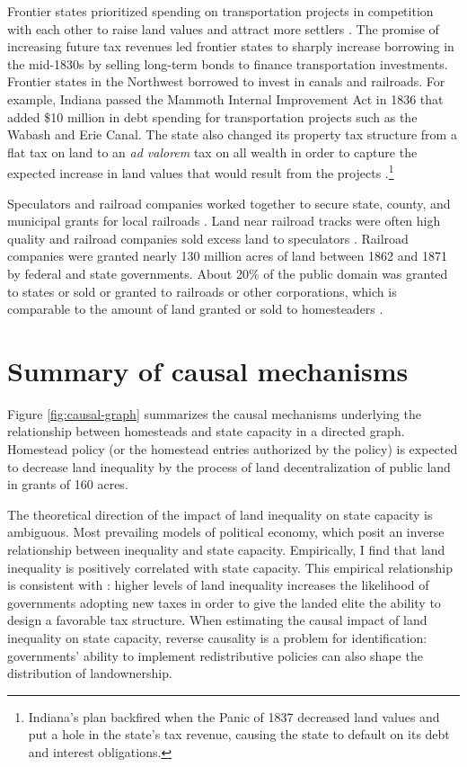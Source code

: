 Frontier states prioritized spending on transportation projects in competition with each other to raise land values and attract more settlers \citep{sylla1998anatomy}. The promise of increasing future tax revenues led frontier states to sharply increase borrowing in the mid-1830s by selling long-term bonds to finance transportation investments. Frontier states in the Northwest borrowed to invest in canals and railroads. For example, Indiana passed the Mammoth Internal Improvement Act in 1836 that added \$10 million in debt spending for transportation projects such as the Wabash and Erie Canal. The state also changed its property tax structure from a flat tax on land to an \emph{ad valorem} tax on all wealth in order to capture the expected increase in land values that would result from the projects \citep{wallis2004sovereign}.\footnote{Indiana's plan backfired when the Panic of 1837 decreased land values and put a hole in the state's tax revenue, causing the state to default on its debt and interest obligations.}

Speculators and railroad companies worked together to secure state, county, and municipal grants for local railroads \citep{gates1939land}. Land near railroad tracks were often high quality and railroad companies sold excess land to speculators \citep{murtazashvili2013political}. Railroad companies were granted nearly 130 million acres of land between 1862 and 1871 by federal and state governments. About 20\% of the public domain was granted to states or sold or granted to railroads or other corporations, which is comparable to the amount of land granted or sold to homesteaders \citep{shanks2005homestead}. 

\section{Summary of causal mechanisms}

Figure \ref{fig:causal-graph} summarizes the causal mechanisms underlying the relationship between homesteads and state capacity in a directed graph. Homestead policy (or the homestead entries authorized by the policy) is expected to decrease land inequality by the process of land decentralization of public land in grants of 160 acres.

The theoretical direction of the impact of land inequality on state capacity is ambiguous. Most prevailing models of political economy, which posit an inverse relationship between inequality and state capacity. Empirically, I find that land inequality is positively correlated with state capacity. This empirical relationship is consistent with \cite{mares2015non}: higher levels of land inequality increases the likelihood of governments adopting new taxes in order to give the landed elite the ability to design a favorable tax structure. When estimating the causal impact of land inequality on state capacity, reverse causality is a problem for identification: governments' ability to implement redistributive policies can also shape the distribution of landownership.


